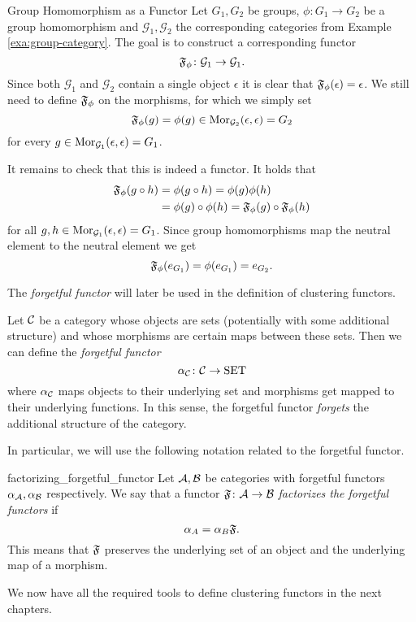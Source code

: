 \begin{example}{Group Homomorphism as a Functor}{}
Let $G_1, G_2$ be groups, $\phi\colon G_1 \to G_2$ be a group homomorphism and $\mathcal{G}_1,\mathcal{G}_2$ the corresponding categories from Example \ref{exa:group-category}. The goal is to construct a corresponding functor 
$$
\mathfrak{F}_\phi\colon \mathcal{G}_1 \to \mathcal{G}_1.
$$
Since both $\mathcal{G}_1$ and $\mathcal{G}_2$ contain a single object $\epsilon$ it is clear that $\mathfrak{F}_\phi(\epsilon) = \epsilon$. We still need to define $\mathfrak{F}_\phi$ on the morphisms, for which we simply set
$$
\mathfrak{F}_\phi(g) = \phi(g) \in \mathrm {Mor}_{\mathcal{G}_2}(\epsilon, \epsilon) = G_2
$$
for every $g \in \mathrm {Mor}_{\mathcal{G}_1}(\epsilon, \epsilon) = G_1$. \par

\medskip It remains to check that this is indeed a functor. It holds that
\begin{equation*}
\begin{split}
\mathfrak{F}_\phi(g \circ h) &= \phi(g \circ h) = \phi(g)\phi(h) \\
&= \phi(g) \circ \phi(h) = \mathfrak{F}_\phi(g) \circ \mathfrak{F}_\phi(h)
\end{split}
\end{equation*}
for all $g,h \in \mathrm {Mor}_{\mathcal{G}_1}(\epsilon, \epsilon) = G_1$. Since group homomorphisms map the neutral element to the neutral element we get
\begin{equation*}
\mathfrak{F}_\phi(e_{G_1}) = \phi(e_{G_1}) = e_{G_2}.
\end{equation*}
\end{example}

The \emph{forgetful functor} will later be used in the definition of clustering functors.

\begin{definition}{\cite[Chap.~1~Ex.~10]{Roman2017}}{}
Let $\mathcal{C}$ be a category whose objects are sets (potentially with some additional structure) and whose morphisms are certain maps between these sets. Then we can define the \emph{forgetful functor}
$$
\alpha_{\mathcal{C}}\colon \mathcal{C} \to \mathrm{SET}
$$
where $\alpha_{\mathcal{C}}$ maps objects to their underlying set and morphisms get mapped to their underlying functions. In this sense, the forgetful functor \emph{forgets} the additional structure of the category.
\end{definition}

In particular, we will use the following notation related to the forgetful functor.

\begin{notation}{}{factorizing_forgetful_functor}
Let $\mathcal{A}, \mathcal{B}$ be categories with forgetful functors $\alpha_{\mathcal{A}}, \alpha_{\mathcal{B}}$ respectively. We say that a functor $\mathfrak{F}\colon \mathcal{A} \to \mathcal{B}$ \emph{factorizes the forgetful functors} if
\begin{equation*}
    \alpha_A = \alpha_B \mathfrak{F}.
\end{equation*}
This means that $\mathfrak{F}$ preserves the underlying set of an object and the underlying map of a morphism.
\end{notation}

\medskip We now have all the required tools to define clustering functors in the next chapters.